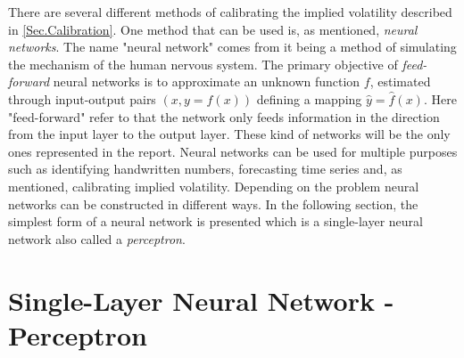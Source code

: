 There are several different methods of calibrating the implied volatility described in \autoref{Sec.Calibration}. One method that can be used is, as mentioned, \emph{neural networks}. The name "neural network" comes from it being a method of simulating the mechanism of the human nervous system. The primary objective of \emph{feed-forward} neural networks is to approximate an unknown function $f$, estimated through input-output pairs $(x, y = f(x))$ defining a mapping $\hat{y} = \hat{f}(x)$. Here "feed-forward" refer to that the network only feeds information in the direction from the input layer to the output layer. These kind of networks will be the only ones represented in the report. Neural networks can be used for multiple purposes such as identifying handwritten numbers, forecasting time series and, as mentioned, calibrating implied volatility. Depending on the problem neural networks can be constructed in different ways. In the following section, the simplest form of a neural network is presented which is a single-layer neural network also called a \emph{perceptron}.


\section{Single-Layer Neural Network - Perceptron}

